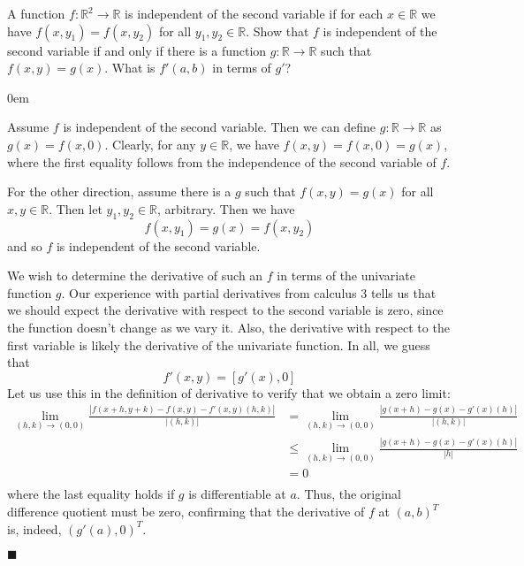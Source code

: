 \documentclass[12pt]{article}
\renewcommand{\qed}{\hfill$\blacksquare$}
\renewenvironment{proof}{\begin{addmargin}[1em]{0em}\begin{newproof}}{\end{newproof}\end{addmargin}\qed}
\newenvironment{problem}[2][Problem]{\begin{trivlist}
\item[\hskip \labelsep {\bfseries #1}\hskip \labelsep {\bfseries #2.}]}{\end{trivlist}}
\begin{document}
\begin{problem}{2.2}
A function $f:\mathbb{R}^2\rightarrow \mathbb{R}$ is independent of the second variable if for each $x\in \mathbb{R}$ we have $f\left(x,y_1\right) = f\left(x,y_2\right)$ for all $y_1,y_2 \in \mathbb{R}$. Show that $f$ is independent of the second variable if and only if there is a function $g:\mathbb{R}\rightarrow \mathbb{R}$ such that $f\left(x,y\right) = g\left(x\right)$. What is $f'\left(a,b\right)$ in terms of $g'$?
\end{problem}

\begin{proof}
Assume $f$ is independent of the second variable. Then we can define $g:\mathbb{R}\rightarrow \mathbb{R}$ as $g\left(x\right) = f\left(x,0\right)$. Clearly, for any $y\in \mathbb{R}$, we have $f\left(x,y\right) = f\left(x,0\right) = g\left(x\right)$, where the first equality follows from the independence of the second variable of $f$.

For the other direction, assume there is a $g$ such that $f\left(x,y\right)=g\left(x\right)$ for all $x,y \in \mathbb{R}$. Then let $y_1, y_2 \in \mathbb{R}$, arbitrary. Then we have
$$ f\left(x,y_1\right) = g\left(x\right) = f\left(x,y_2\right) $$ and so $f$ is independent of the second variable.

We wish to determine the derivative of such an $f$ in terms of the univariate function $g$. Our experience with partial derivatives from calculus 3 tells us that we should expect the derivative with respect to the second variable is zero, since the function doesn't change as we vary it. Also, the derivative with respect to the first variable is likely the derivative of the univariate function. In all, we guess that
$$ f'\left(x,y\right) = \left[g'\left(x\right),0\right] $$ Let us use this in the definition of derivative to verify that we obtain a zero limit:
\begin{equation*} \begin{split}
\lim_{\left(h,k\right)\rightarrow \left(0,0\right)} \frac{\left| f\left(x+h,y+k\right)-f\left(x,y\right)-f'\left(x,y\right) \left(h,k\right)\right|}{\left| \left(h,k\right)\right|} & = \lim_{\left(h,k\right)\rightarrow \left(0,0\right)} \frac{\left| g\left(x+h\right) - g\left(x\right) - g'\left(x\right) \left(h\right)\right|}{\left|\left(h,k\right)\right|} \\
& \leq \lim_{\left(h,k\right)\rightarrow \left(0,0\right)} \frac{\left| g\left(x+h\right) - g\left(x\right) - g'\left(x\right) \left(h\right)\right|}{\left|h\right|} \\
& = 0 \\
\end{split}\end{equation*}
where the last equality holds if $g$ is differentiable at $a$. Thus, the original difference quotient must be zero, confirming that the derivative of $f$ at $\left(a,b\right)^T$ is, indeed, $\left(g'\left(a\right),0\right)^T$.
\end{proof}
\end{document}
